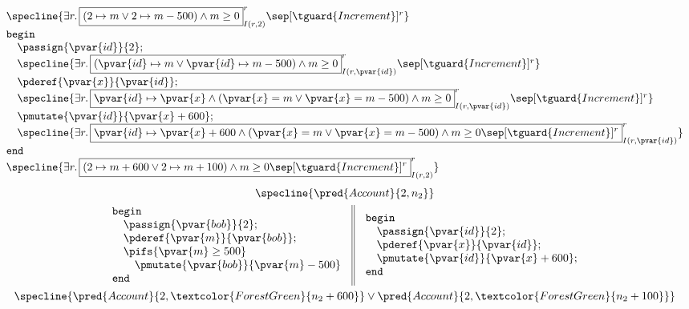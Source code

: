 \[
	\begin{array}{l}
		\specline{
			\exists r \ldotp
				\boxed{
					\left( 2 \mapsto m \lor 2 \mapsto m - 500 \right) \land m \geq 0
				}^r_{I(r, 2)}
				\sep [\tguard{Increment}]^r
		} \\
		\mathtt{begin} \\
			\quad \passign{\pvar{id}}{2}; \\
			\quad \specline{
				\exists r \ldotp
					\boxed{
						\left( \pvar{id} \mapsto m \lor \pvar{id} \mapsto m - 500\right) \land m \geq 0
					}^r_{I(r, \pvar{id})}
					\sep [\tguard{Increment}]^r
			} \\
			\quad \pderef{\pvar{x}}{\pvar{id}}; \\
			\quad \specline{
				\exists r \ldotp
					\boxed{
						\pvar{id} \mapsto \pvar{x} \land \left( \pvar{x} = m \lor \pvar{x} = m - 500 \right) \land m \geq 0
					}^r_{I(r, \pvar{id})}
					\sep [\tguard{Increment}]^r
			} \\
			\quad \pmutate{\pvar{id}}{\pvar{x} + 600}; \\
			\quad \specline{
				\exists r \ldotp
					\boxed{
						\pvar{id} \mapsto \pvar{x} + 600 \land \left( \pvar{x} = m \lor \pvar{x} = m - 500 \right) \land m \geq 0 \sep [\tguard{Increment}]^r
					}^r_{I(r, \pvar{id})}
			} \\
		\mathtt{end} \\
		\specline{
				\exists r \ldotp
					\boxed{
						\left(2 \mapsto m + 600 \lor 2 \mapsto m + 100 \right) \land m \geq 0 \sep [\tguard{Increment}]^r
					}^r_{I(r, 2)}
		}
	\end{array}
\]
\begin{gather*}
\specline{\pred{Account}{2, n_2}} \\
\begin{array}{c || c}
	\begin{array}{l}
		\mathtt{begin} \\
			\quad \passign{\pvar{bob}}{2}; \\
			\quad \pderef{\pvar{m}}{\pvar{bob}}; \\
			\quad \pifs{\pvar{m} \geq 500} \\
			\quad \quad \pmutate{\pvar{bob}}{\pvar{m} - 500} \\
		\mathtt{end}
	\end{array}
	&
	\begin{array}{l}
		\mathtt{begin} \\
			\quad \passign{\pvar{id}}{2}; \\
			\quad \pderef{\pvar{x}}{\pvar{id}}; \\
			\quad \pmutate{\pvar{id}}{\pvar{x} + 600}; \\
		\mathtt{end}
	\end{array}
\end{array} \\
\specline{
	\pred{Account}{2, \textcolor{ForestGreen}{n_2 + 600}}
		\lor
	\pred{Account}{2, \textcolor{ForestGreen}{n_2 + 100}}
}
\end{gather*}